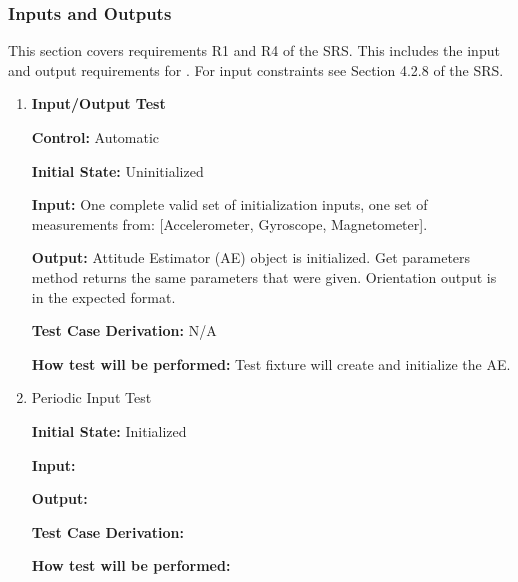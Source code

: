 \documentclass[12pt, titlepage]{article}
\begin{document}
\subsubsection{Inputs and Outputs}

This section covers requirements R1 and R4 of the SRS. This includes the input and output requirements for \progname{}. For input constraints see Section 4.2.8 of the SRS.

		

\begin{enumerate}

\item{\textbf{Input/Output Test}\\}

    \textbf{Control:} Automatic
                
    \textbf{Initial State:} Uninitialized
                
    \textbf{Input:} One complete valid set of initialization inputs, one set of measurements from: [Accelerometer, Gyroscope, Magnetometer].
                
    \textbf{Output:} Attitude Estimator (AE) object is initialized. Get parameters method returns the same parameters that were given. Orientation output is in the expected format.

    \textbf{Test Case Derivation:} N/A
                
    \textbf{How test will be performed:} Test fixture will create and initialize the AE.

\item{Periodic Input Test\\}
              
    \textbf{Initial State:} Initialized
                
    \textbf{Input:}
                
    \textbf{Output:} 

    \textbf{Test Case Derivation:} 

    \textbf{How test will be performed:}

\end{enumerate}
\end{document}
